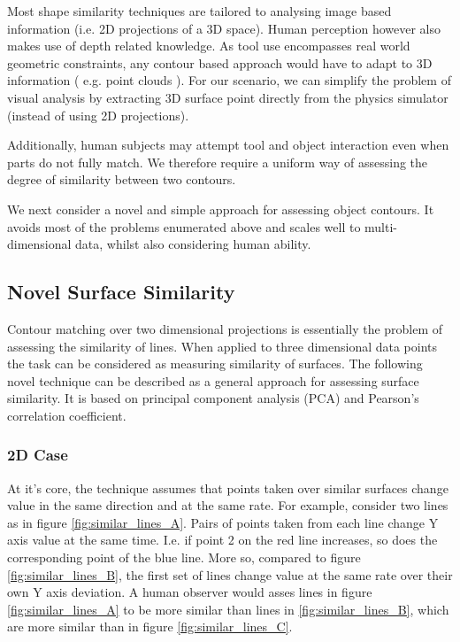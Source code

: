 \documentclass[
    floatsintext
]{article}
\begin{document}
Most shape similarity techniques are tailored to analysing image based information (i.e. 2D projections of a 3D space).
Human perception however also makes use of depth related knowledge.
As tool use encompasses real world geometric constraints, any contour based approach would have to adapt to 3D information ( e.g. point clouds ).
For our scenario, we can simplify the problem of visual analysis by extracting 3D surface point directly from the physics simulator (instead of using 2D projections). 

Additionally, human subjects may attempt tool and object interaction even when parts do not fully match. 
We therefore require a uniform way of assessing the degree of similarity between two contours. 

We next consider a novel and simple approach for assessing object contours.
It avoids most of the problems enumerated above and scales well to multi-dimensional data, whilst also considering human ability.  

\subsection{Novel Surface Similarity}
Contour matching over two dimensional projections is essentially the problem of assessing the similarity of lines.  
When applied to three dimensional data points the task can be considered as measuring similarity of surfaces.  
The following novel technique can be described as a general approach for assessing surface similarity. 
It is based on principal component analysis (PCA) and Pearson's correlation coefficient. 

\subsubsection{2D Case}
At it's core, the technique assumes that points taken over similar surfaces change value in the same direction and at the same rate. 
For example, consider two lines as in figure \ref{fig:similar_lines_A}. Pairs of points taken from each line change Y axis value at the same time. 
I.e. if point 2 on the red line increases, so does the corresponding point of the blue line.   
More so, compared to figure \ref{fig:similar_lines_B}, the first set of lines change value at the same rate over their own Y axis deviation.
A human observer would asses lines in figure \ref{fig:similar_lines_A} to be more similar than lines in \ref{fig:similar_lines_B},
which are more similar than in figure \ref{fig:similar_lines_C}.
\end{document}
